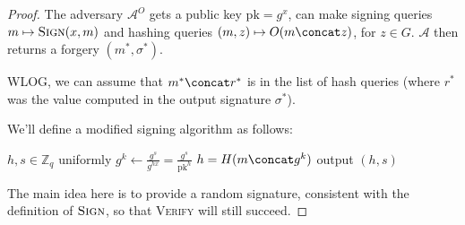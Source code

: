 \begin{proof}
    The adversary $\mathcal{A}^O$ gets a public key $\mathrm{pk} = g^x$, can make signing queries $m \mapsto \textsc{Sign}(x, m)$ and hashing queries $(m, z) \mapsto O(m \concat z)$, for $z \in G$. $\mathcal{A}$ then returns a forgery $(m^*, \sigma^*)$.
    \begin{center}
    \end{center}

    WLOG, we can assume that $m^* \concat r^*$ is in the list of hash queries (where $r^*$ was the value computed in the output signature $\sigma^*$).

    We'll define a modified signing algorithm as follows:
    \begin{algorithmic}
        \State $h, s \in \mathbb{Z}_q$ uniformly
        \State $g^k \gets \frac{g^s}{g^{hx}} = \frac{g^s}{\mathrm{pk}^h}$
        \State $h = H(m \concat g^k)$
        \State output $(h, s)$
        \EndFunction
    \end{algorithmic}
    The main idea here is to provide a random signature, consistent with the definition of $\textsc{Sign}$, so that \textsc{Verify} will still succeed.


\end{proof}
